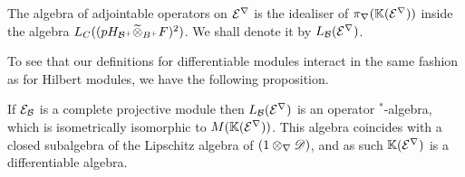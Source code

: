 \begin{definition}
	The algebra of adjointable operators on $\mathcal{E}^\nabla$ is the idealiser of $\pi_\nabla(\mathbb{K}(\mathcal{E}^\nabla))$ inside the algebra $L_C((pH_{\mathcal{B}^+}\widetilde{\otimes}_{B^+} F)^2)$. We shall denote it by $L_{\mathcal{B}}(\mathcal{E}^\nabla)$. 
\end{definition}
To see that our definitions for differentiable modules interact in the same fashion as for Hilbert modules, we have the following proposition.
\begin{proposition}\label{differentiablealgebra}
	If $\mathcal{E}_{\mathcal{B}}$ is a complete projective module then $L_{\mathcal{B}}(\mathcal{E}^\nabla)$ is an operator $^*$-algebra, which is isometrically isomorphic to $M(\mathbb{K}(\mathcal{E}^\nabla))$. This algebra coincides with a closed subalgebra of the Lipschitz algebra of $(1\otimes_\nabla \mathscr{D})$, and as such $\mathbb{K}(\mathcal{E}^\nabla)$ is a differentiable algebra. 
\end{proposition}
